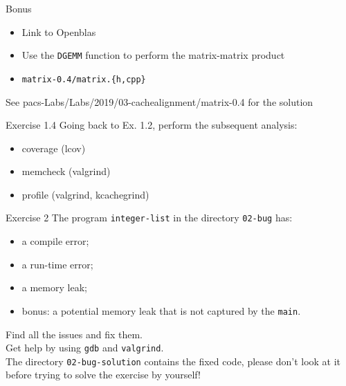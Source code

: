 \documentclass[10pt]{beamer}
\begin{document}
\begin{frame}{Bonus}
\begin{itemize}
\item Link to Openblas
\item Use the {\tt DGEMM} function to perform the matrix-matrix product
\item {\tt matrix-0.4/matrix.\{h,cpp\}}
\end{itemize}
See pacs-Labs/Labs/2019/03-cachealignment/matrix-0.4 for the solution
\end{frame}

\begin{frame}{Exercise 1.4}
Going back to Ex. 1.2, perform the subsequent analysis:
\begin{itemize}
\item coverage ({\ttfamily lcov})
\item memcheck ({\ttfamily valgrind})
\item profile ({\ttfamily valgrind, kcachegrind})
\end{itemize}
\end{frame}

\begin{frame}{Exercise 2}
The program \texttt{integer-list} in the directory \texttt{02-bug} has:

\begin{itemize}
    \item a compile error;
    \item a run-time error;
    \item a memory leak;
    \item bonus: a potential memory leak that is not captured by the \texttt{main}.
\end{itemize}
\vspace{0.5cm}
Find all the issues and fix them. \\[3mm]

Get help by using \texttt{gdb} and \texttt{valgrind}.\\[3mm]

The directory \texttt{02-bug-solution} contains the fixed code,
please don't look at it before trying to solve the exercise by yourself!
\end{frame}
\end{document}
